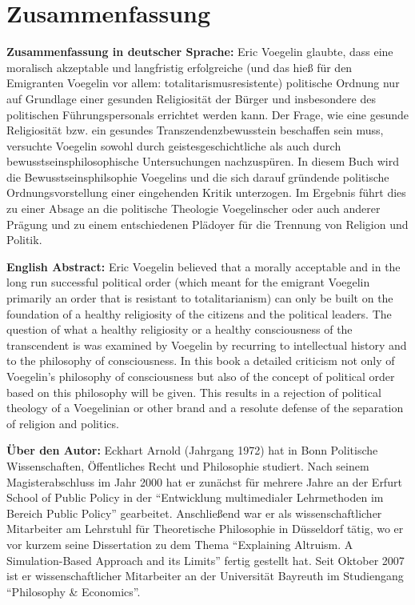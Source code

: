 \newpage

\chapter*{Zusammenfassung}

\setlength{\parindent}{0cm}

\setlength{\parskip}{0.5cm}

{\bf Zusammenfassung in deutscher Sprache:} Eric Voegelin glaubte, dass eine
moralisch akzeptable und langfristig erfolgreiche (und das hieß für den
Emigranten Voegelin vor allem: totalitarismusresistente) politische Ordnung
nur auf Grundlage einer gesunden Religiosität der Bürger und insbesondere des
politischen Führungspersonals errichtet werden kann. Der Frage, wie eine
gesunde Religiosität bzw. ein gesundes Transzendenzbewusstein beschaffen sein
muss, versuchte Voegelin sowohl durch geistesgeschichtliche als auch durch
bewusstseinsphilosophische Untersuchungen nachzuspüren. In diesem Buch wird
die Bewusstseinsphilsophie Voegelins und die sich darauf gründende politische
Ordnungsvorstellung einer eingehenden Kritik unterzogen. Im Ergebnis führt
dies zu einer Absage an die politische Theologie Voegelinscher oder auch
anderer Prägung und zu einem entschiedenen Plädoyer für die Trennung von Religion
und Politik.

{\bf English Abstract:} Eric Voegelin believed that a morally acceptable and
in the long run successful political order (which meant for the emigrant
Voegelin primarily an order that is resistant to totalitarianism) can only be
built on the foundation of a healthy religiosity of the citizens and the
political leaders. The question of what a healthy religiosity or a healthy
consciousness of the transcendent is was examined by Voegelin by recurring to
intellectual history and to the philosophy of consciousness. In this book a
detailed criticism not only of Voegelin's philosophy of consciousness but also
of the concept of political order based on this philosophy will be given. This
results in a rejection of political theology of a Voegelinian or other brand
and a resolute defense of the separation of religion and politics.

{\bf Über den Autor:} Eckhart Arnold (Jahrgang 1972) hat in Bonn 
Politische Wissenschaften, Öffentliches Recht und Philosophie studiert. Nach
seinem Magisterabschluss im Jahr 2000 hat er zunächst für mehrere Jahre
an der Erfurt School of Public Policy in der "`Entwicklung multimedialer 
Lehrmethoden im Bereich Public Policy"' gearbeitet. Anschließend war er als 
wissenschaftlicher Mitarbeiter am Lehrstuhl für Theoretische Philosophie in
Düsseldorf tätig, wo er vor kurzem seine Dissertation zu dem Thema
"`Explaining Altruism. A Simulation-Based Approach and its Limits"' 
fertig gestellt hat. Seit Oktober 2007 ist er wissenschaftlicher Mitarbeiter
an der Universität Bayreuth im Studiengang "`Philosophy \& Economics"'.

